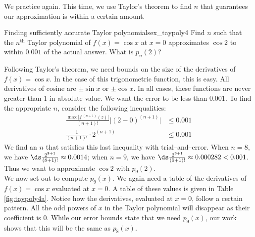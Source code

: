 We practice again. This time, we use Taylor's theorem to find $n$ that guarantees our approximation is within a certain amount.\\


\begin{example}{Finding sufficiently accurate Taylor polynomials}{ex_taypoly4}{
Find $n$ such that the $n^\text{th}$ Taylor polynomial of $f(x)=\cos x$ at $x=0$ approximates $\cos 2$ to within $0.001$ of the actual answer. What is $p_n(2)$?}
\end{example}


\begin{solution}
{Following Taylor's theorem, we need bounds on the size of the derivatives of $f(x)=\cos x$. In the case of this trigonometric function, this is easy. All derivatives of cosine are $\pm \sin x$ or $\pm \cos x$. In all cases, these functions are never greater than 1 in absolute value. We want the error to be less than $0.001$. To find the appropriate $n$, consider the following inequalities:
\begin{align*}
\frac{\max\big|f\,^{(n+1)}(z)\big|}{(n+1)!}\big|(2-0)^{(n+1)}\big| &\leq 0.001 \\
\frac1{(n+1)!}\cdot2^{(n+1)} &\leq 0.001
\end{align*}
We find an $n$ that satisfies this last inequality with trial--and--error. When $n=8$, we have $\ds \frac{2^{8+1}}{(8+1)!} \approx 0.0014$; when $n=9$, we have $\ds \frac{2^{9+1}}{(9+1)!} \approx 0.000282 <0.001$. Thus we want to approximate $\cos 2$ with $p_9(2)$.\\

We now set out to compute $p_9(x)$. We again need a table of the derivatives of $f(x)=\cos x$ evaluated at $x=0$. A table of these values is given in Table \ref{fig:taypoly4a}.
Notice how the derivatives, evaluated at $x=0$, follow a certain pattern. All the odd powers of $x$ in the Taylor polynomial will disappear as their coefficient is 0. While our error bounds state that we need $p_9(x)$, our work shows that this will be the same as $p_8(x)$. 

}
\end{solution}
